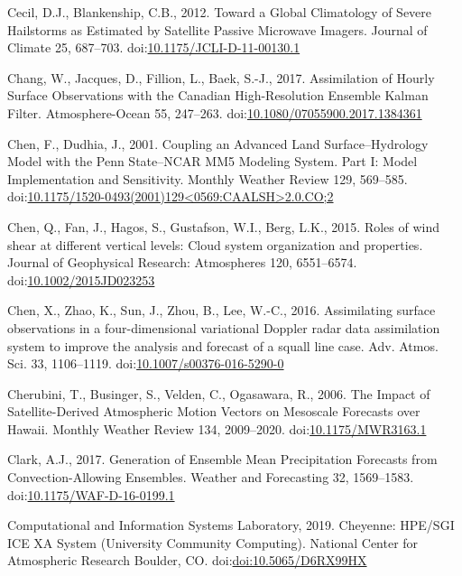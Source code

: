 \documentclass[final,5p,times,twocolumn,authoryear]{elsarticle} %
\begin{document}
\leavevmode\hypertarget{ref-cecil2012}{}%
Cecil, D.J., Blankenship, C.B., 2012. Toward a Global Climatology of Severe Hailstorms as Estimated by Satellite Passive Microwave Imagers. Journal of Climate 25, 687--703. doi:\href{https://doi.org/10.1175/JCLI-D-11-00130.1}{10.1175/JCLI-D-11-00130.1}

\leavevmode\hypertarget{ref-chang2017}{}%
Chang, W., Jacques, D., Fillion, L., Baek, S.-J., 2017. Assimilation of Hourly Surface Observations with the Canadian High-Resolution Ensemble Kalman Filter. Atmosphere-Ocean 55, 247--263. doi:\href{https://doi.org/10.1080/07055900.2017.1384361}{10.1080/07055900.2017.1384361}

\leavevmode\hypertarget{ref-chen2001}{}%
Chen, F., Dudhia, J., 2001. Coupling an Advanced Land Surface--Hydrology Model with the Penn State--NCAR MM5 Modeling System. Part I: Model Implementation and Sensitivity. Monthly Weather Review 129, 569--585. doi:\href{https://doi.org/10.1175/1520-0493(2001)129\%3C0569:CAALSH\%3E2.0.CO;2}{10.1175/1520-0493(2001)129\textless0569:CAALSH\textgreater2.0.CO;2}

\leavevmode\hypertarget{ref-chen2015}{}%
Chen, Q., Fan, J., Hagos, S., Gustafson, W.I., Berg, L.K., 2015. Roles of wind shear at different vertical levels: Cloud system organization and properties. Journal of Geophysical Research: Atmospheres 120, 6551--6574. doi:\href{https://doi.org/10.1002/2015JD023253}{10.1002/2015JD023253}

\leavevmode\hypertarget{ref-chen2016}{}%
Chen, X., Zhao, K., Sun, J., Zhou, B., Lee, W.-C., 2016. Assimilating surface observations in a four-dimensional variational Doppler radar data assimilation system to improve the analysis and forecast of a squall line case. Adv. Atmos. Sci. 33, 1106--1119. doi:\href{https://doi.org/10.1007/s00376-016-5290-0}{10.1007/s00376-016-5290-0}

\leavevmode\hypertarget{ref-cherubini2006}{}%
Cherubini, T., Businger, S., Velden, C., Ogasawara, R., 2006. The Impact of Satellite-Derived Atmospheric Motion Vectors on Mesoscale Forecasts over Hawaii. Monthly Weather Review 134, 2009--2020. doi:\href{https://doi.org/10.1175/MWR3163.1}{10.1175/MWR3163.1}

\leavevmode\hypertarget{ref-clark2017}{}%
Clark, A.J., 2017. Generation of Ensemble Mean Precipitation Forecasts from Convection-Allowing Ensembles. Weather and Forecasting 32, 1569--1583. doi:\href{https://doi.org/10.1175/WAF-D-16-0199.1}{10.1175/WAF-D-16-0199.1}

\leavevmode\hypertarget{ref-Cheyenne2019}{}%
Computational and Information Systems Laboratory, 2019. Cheyenne: HPE/SGI ICE XA System (University Community Computing). National Center for Atmospheric Research Boulder, CO. doi:\href{https://doi.org/doi:10.5065/D6RX99HX}{doi:10.5065/D6RX99HX}
\end{document}
